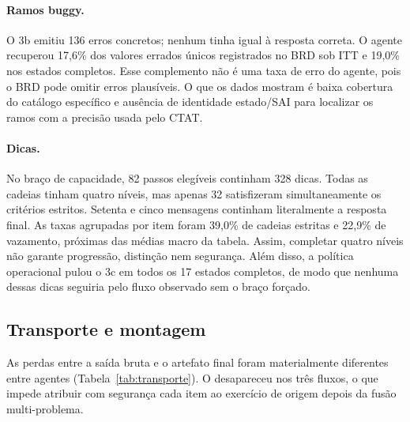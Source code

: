 \documentclass[11pt,a4paper]{article}
\newcommand{\ITT}{ITT}
\begin{document}
\paragraph{Ramos buggy.} O 3b emitiu 136 erros concretos; nenhum tinha  igual à resposta correta. O agente recuperou 17,6\% dos valores errados únicos registrados no BRD sob \ITT{} e 19,0\% nos estados completos. Esse complemento não é uma taxa de erro do agente, pois o BRD pode omitir erros plausíveis. O que os dados mostram é baixa cobertura do catálogo específico e ausência de identidade estado/SAI para localizar os ramos com a precisão usada pelo CTAT.

\paragraph{Dicas.} No braço de capacidade, 82 passos elegíveis continham 328 dicas. Todas as cadeias tinham quatro níveis, mas apenas 32 satisfizeram simultaneamente os critérios estritos. Setenta e cinco mensagens continham literalmente a resposta final. As taxas agrupadas por item foram 39,0\% de cadeias estritas e 22,9\% de vazamento, próximas das médias macro da tabela. Assim, completar quatro níveis não garante progressão, distinção nem segurança. Além disso, a política operacional pulou o 3c em todos os 17 estados completos, de modo que nenhuma dessas dicas seguiria pelo fluxo observado sem o braço forçado.

\subsection{Transporte e montagem}

As perdas entre a saída bruta e o artefato final foram materialmente diferentes entre agentes (Tabela~\ref{tab:transporte}). O  desapareceu nos três fluxos, o que impede atribuir com segurança cada item ao exercício de origem depois da fusão multi-problema.
\end{document}

